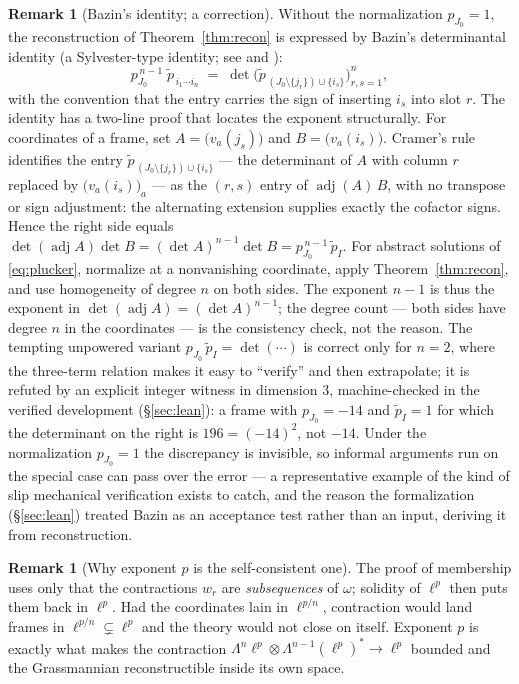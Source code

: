 \documentclass[11pt]{amsart}
\theoremstyle{definition}
\newtheorem{remark}[theorem]{Remark}
\begin{document}
\begin{remark}[Bazin's identity; a correction]\label{rem:bazin}
Without the normalization $p_{J_0}=1$, the reconstruction of Theorem~\ref{thm:recon} is expressed by Bazin's determinantal identity (a Sylvester-type identity; see \cite{BS} and \cite[Ch.~V]{Muir}):
\[
p_{J_0}^{\,n-1}\;\tilde p_{\,i_1\cdots i_n}\;=\;\det\Big(\tilde p_{\,(J_0\setminus\{j_r\})\cup\{i_s\}}\Big)_{r,s=1}^{n},
\]
with the convention that the entry carries the sign of inserting $i_s$ into slot $r$. The identity has a two-line proof that locates the exponent structurally. For coordinates of a frame, set $A=\big(v_a(j_s)\big)$ and $B=\big(v_a(i_s)\big)$. Cramer's rule identifies the entry $\tilde p_{\,(J_0\setminus\{j_r\})\cup\{i_s\}}$ --- the determinant of $A$ with column $r$ replaced by $\big(v_a(i_s)\big)_a$ --- as the $(r,s)$ entry of $\operatorname{adj}(A)\,B$, with no transpose or sign adjustment: the alternating extension supplies exactly the cofactor signs. Hence the right side equals $\det(\operatorname{adj}A)\det B=(\det A)^{n-1}\det B=p_{J_0}^{\,n-1}\,\tilde p_I$. For abstract solutions of \eqref{eq:plucker}, normalize at a nonvanishing coordinate, apply Theorem~\ref{thm:recon}, and use homogeneity of degree $n$ on both sides. The exponent $n-1$ is thus the exponent in $\det(\operatorname{adj}A)=(\det A)^{n-1}$; the degree count --- both sides have degree $n$ in the coordinates --- is the consistency check, not the reason. The tempting unpowered variant $p_{J_0}\,\tilde p_I=\det(\cdots)$ is correct only for $n=2$, where the three-term relation makes it easy to ``verify'' and then extrapolate; it is refuted by an explicit integer witness in dimension $3$, machine-checked in the verified development (\S\ref{sec:lean}): a frame with $p_{J_0}=-14$ and $\tilde p_I=1$ for which the determinant on the right is $196=(-14)^2$, not $-14$. Under the normalization $p_{J_0}=1$ the discrepancy is invisible, so informal arguments run on the special case can pass over the error --- a representative example of the kind of slip mechanical verification exists to catch, and the reason the formalization (\S\ref{sec:lean}) treated Bazin as an acceptance test rather than an input, deriving it from reconstruction.
\end{remark}

\begin{remark}[Why exponent $p$ is the self-consistent one]\label{rem:selfcon}
The proof of membership uses only that the contractions $w_r$ are \emph{subsequences} of $\omega$; solidity of $\ell^p$ then puts them back in $\ell^p$. Had the coordinates lain in $\ell^{p/n}$, contraction would land frames in $\ell^{p/n}\subsetneq\ell^p$ and the theory would not close on itself. Exponent $p$ is exactly what makes the contraction $\Lambda^n\ell^p\otimes\Lambda^{n-1}(\ell^p)^*\to\ell^p$ bounded and the Grassmannian reconstructible inside its own space.
\end{remark}
\end{document}
